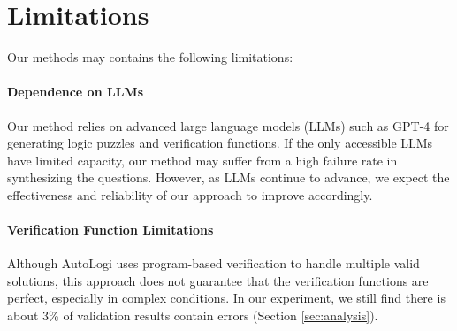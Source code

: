 \section*{Limitations}

Our methods may contains the following limitations:

\paragraph{Dependence on LLMs} Our method relies on advanced large language models (LLMs) such as GPT-4 for generating logic puzzles and verification functions. If the only accessible LLMs have limited capacity, our method may suffer from a high failure rate in synthesizing the questions. However, as LLMs continue to advance, we expect the effectiveness and reliability of our approach to improve accordingly.

\paragraph{Verification Function Limitations} Although AutoLogi uses program-based verification to handle multiple valid solutions, this approach does not guarantee that the verification functions are perfect, especially in complex conditions. In our experiment, we still find there is about 3\% of validation results contain errors (Section \ref{sec:analysis}).